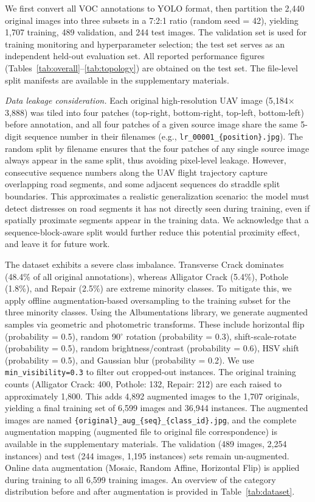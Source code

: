 \documentclass{ieeeaccess}
\begin{document}
We first convert all VOC annotations to YOLO format, then partition the 2,440 original images into three subsets in a 7:2:1 ratio (random seed = 42), yielding 1,707 training, 489 validation, and 244 test images. The validation set is used for training monitoring and hyperparameter selection; the test set serves as an independent held-out evaluation set. All reported performance figures (Tables~\ref{tab:overall}--\ref{tab:topology}) are obtained on the test set. The file-level split manifests are available in the supplementary materials.

\textit{Data leakage consideration.} Each original high-resolution UAV image (5,184$\times$3,888) was tiled into four patches (top-right, bottom-right, top-left, bottom-left) before annotation, and all four patches of a given source image share the same 5-digit sequence number in their filenames (e.g., \texttt{lr\_00001\_\{position\}.jpg}). The random split by filename ensures that the four patches of any single source image always appear in the same split, thus avoiding pixel-level leakage. However, consecutive sequence numbers along the UAV flight trajectory capture overlapping road segments, and some adjacent sequences do straddle split boundaries. This approximates a realistic generalization scenario: the model must detect distresses on road segments it has not directly seen during training, even if spatially proximate segments appear in the training data. We acknowledge that a sequence-block-aware split would further reduce this potential proximity effect, and leave it for future work.

The dataset exhibits a severe class imbalance. Transverse Crack dominates (48.4\% of all original annotations), whereas Alligator Crack (5.4\%), Pothole (1.8\%), and Repair (2.5\%) are extreme minority classes. To mitigate this, we apply offline augmentation-based oversampling to the training subset for the three minority classes. Using the Albumentations library, we generate augmented samples via geometric and photometric transforms. These include horizontal flip (probability = 0.5), random 90$^\circ$ rotation (probability = 0.3), shift-scale-rotate (probability = 0.5), random brightness/contrast (probability = 0.6), HSV shift (probability = 0.5), and Gaussian blur (probability = 0.2). We use \texttt{min\_visibility=0.3} to filter out cropped-out instances. The original training counts (Alligator Crack: 400, Pothole: 132, Repair: 212) are each raised to approximately 1,800. This adds 4,892 augmented images to the 1,707 originals, yielding a final training set of 6,599 images and 36,944 instances. The augmented images are named \texttt{\{original\}\_aug\_\{seq\}\_\{class\_id\}.jpg}, and the complete augmentation mapping (augmented file to original file correspondence) is available in the supplementary materials. The validation (489 images, 2,254 instances) and test (244 images, 1,195 instances) sets remain un-augmented. Online data augmentation (Mosaic, Random Affine, Horizontal Flip) is applied during training to all 6,599 training images. An overview of the category distribution before and after augmentation is provided in Table~\ref{tab:dataset}.
\end{document}
